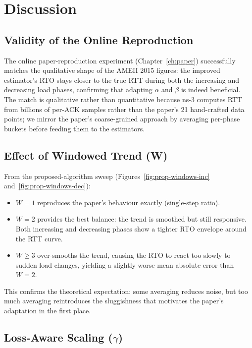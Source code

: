 \documentclass[12pt,a4paper]{report}
\begin{document}
\chapter{Discussion}
\label{ch:discussion}

\section{Validity of the Online Reproduction}

The online paper-reproduction experiment (Chapter~\ref{ch:paper}) successfully
matches the qualitative shape of the AMEII 2015 figures: the improved
estimator's RTO stays closer to the true RTT during both the increasing and
decreasing load phases, confirming that adapting $\alpha$ and $\beta$ is
indeed beneficial.  The match is qualitative rather than quantitative because
ns-3 computes RTT from billions of per-ACK samples rather than the paper's
21 hand-crafted data points; we mirror the paper's coarse-grained approach by
averaging per-phase buckets before feeding them to the estimators.

\section{Effect of Windowed Trend (W)}

From the proposed-algorithm sweep (Figures~\ref{fig:prop-windows-inc}
and~\ref{fig:prop-windows-dec}):
\begin{itemize}
  \item $W=1$ reproduces the paper's behaviour exactly (single-step ratio).
  \item $W=2$ provides the best balance: the trend is smoothed but still
        responsive.  Both increasing and decreasing phases show a tighter
        RTO envelope around the RTT curve.
  \item $W \geq 3$ over-smooths the trend, causing the RTO to react too
        slowly to sudden load changes, yielding a slightly worse mean absolute
        error than $W=2$.
\end{itemize}

This confirms the theoretical expectation: some averaging reduces noise, but
too much averaging reintroduces the sluggishness that motivates the paper's
adaptation in the first place.

\section{Loss-Aware Scaling ($\gamma$)}
\end{document}
